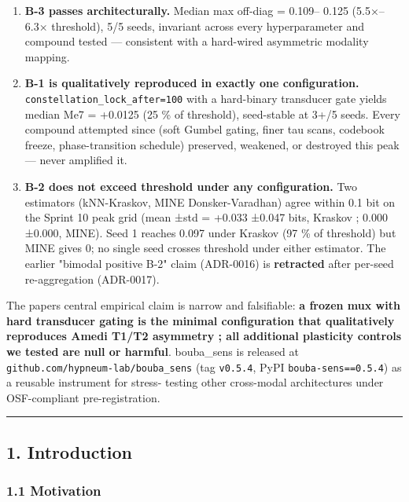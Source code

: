 \documentclass[
]{article}
\providecommand{\tightlist}{%
  \setlength{\itemsep}{0pt}\setlength{\parskip}{0pt}}
\begin{document}
\begin{enumerate}
\def\labelenumi{\arabic{enumi}.}
\tightlist
\item
  \textbf{B-3 passes architecturally.} Median max off-diag = 0.109--
  0.125 (5.5×--6.3× threshold), 5/5 seeds, invariant across every
  hyperparameter and compound tested --- consistent with a hard-wired
  asymmetric modality mapping.
\item
  \textbf{B-1 is qualitatively reproduced in exactly one configuration.}
  \texttt{constellation\_lock\_after=100} with a hard-binary transducer
  gate yields median Me7 = +0.0125 (25 \% of threshold), seed-stable at
  3+/5 seeds. Every compound attempted since (soft Gumbel gating, finer
  tau scans, codebook freeze, phase-transition schedule) preserved,
  weakened, or destroyed this peak --- never amplified it.
\item
  \textbf{B-2 does not exceed threshold under any configuration.} Two
  estimators (kNN-Kraskov, MINE Donsker-Varadhan) agree within 0.1 bit
  on the Sprint 10 peak grid (mean ±std = +0.033 ±0.047 bits, Kraskov ;
  0.000 ±0.000, MINE). Seed 1 reaches 0.097 under Kraskov (97 \% of
  threshold) but MINE gives 0; no single seed crosses threshold under
  either estimator. The earlier "bimodal positive B-2" claim (ADR-0016)
  is \textbf{retracted} after per-seed re-aggregation (ADR-0017).
\end{enumerate}

The paper\textquotesingle s central empirical claim is narrow and
falsifiable: \textbf{a frozen mux with hard transducer gating is the
minimal configuration that qualitatively reproduces Amedi T1/T2
asymmetry ; all additional plasticity controls we tested are null or
harmful}. bouba\_sens is released at
\texttt{github.com/hypneum-lab/bouba\_sens} (tag \texttt{v0.5.4}, PyPI
\texttt{bouba-sens==0.5.4}) as a reusable instrument for stress- testing
other cross-modal architectures under OSF-compliant pre-registration.

\begin{center}\rule{0.5\linewidth}{0.5pt}\end{center}

\subsection{1. Introduction}\label{1-introduction}

\subsubsection{1.1 Motivation}\label{11-motivation}
\end{document}
